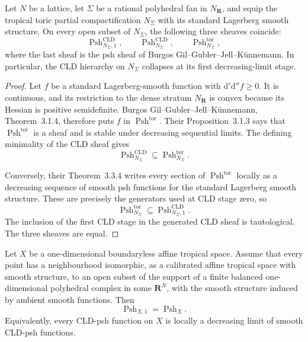 \begin{proposition}
\label{prop:p07-toric-cld-collapse-candidate}
Let $N$ be a lattice, let $\Sigma$ be a rational polyhedral fan in
$N_{\mathbf R}$, and equip the tropical toric partial compactification
$N_\Sigma$ with its standard Lagerberg smooth structure.  On every open
subset of $N_\Sigma$, the following three sheaves coincide:
\[
 \operatorname{Psh}^{\mathrm{CLD}}_{N_\Sigma,1},\qquad
 \operatorname{Psh}^{\mathrm{CLD}}_{N_\Sigma},\qquad
 \operatorname{Psh}^{\mathrm{tor}}_{N_\Sigma},
\]
where the last sheaf is the psh sheaf of Burgos
Gil--Gubler--Jell--K\"unnemann.  In particular, the CLD hierarchy on
$N_\Sigma$ collapses at its first decreasing-limit stage.
\end{proposition}

\begin{proof}
Let $f$ be a standard Lagerberg-smooth function with
$\mathrm d'\mathrm d''f\geq0$.  It is continuous, and its restriction to
the dense stratum $N_{\mathbf R}$ is convex because its Hessian is positive
semidefinite.  Burgos Gil--Gubler--Jell--K\"unnemann, Theorem~3.1.4,
therefore puts $f$ in $\operatorname{Psh}^{\mathrm{tor}}$.  Their
Proposition~3.1.3 says that $\operatorname{Psh}^{\mathrm{tor}}$ is a sheaf
and is stable under decreasing sequential limits.  The defining minimality
of the CLD sheaf gives
\[
 \operatorname{Psh}^{\mathrm{CLD}}_{N_\Sigma}
 \subseteq \operatorname{Psh}^{\mathrm{tor}}_{N_\Sigma}.
\]

Conversely, their Theorem~3.3.4 writes every section of
$\operatorname{Psh}^{\mathrm{tor}}$ locally as a decreasing sequence of
smooth psh functions for the standard Lagerberg smooth structure.  These
are precisely the generators used at CLD stage zero, so
\[
 \operatorname{Psh}^{\mathrm{tor}}_{N_\Sigma}
 \subseteq \operatorname{Psh}^{\mathrm{CLD}}_{N_\Sigma,1}.
\]
The inclusion of the first CLD stage in the generated CLD sheaf is
tautological.  The three sheaves are equal.
\end{proof}

\begin{theorem}
\label{thm:p07-finite-tropical-curve-collapse-candidate}
Let $X$ be a one-dimensional boundaryless affine tropical space.  Assume
that every point has a neighbourhood isomorphic, as a calibrated affine
tropical space with smooth structure, to an open subset of the support of a
finite balanced one-dimensional polyhedral complex in some $\mathbf R^N$,
with the smooth structure induced by ambient smooth functions.  Then
\[
                    \operatorname{Psh}_{X,1}
                    =\operatorname{Psh}_X.
\]
Equivalently, every CLD-psh function on $X$ is locally a decreasing limit of
smooth CLD-psh functions.
\end{theorem}

